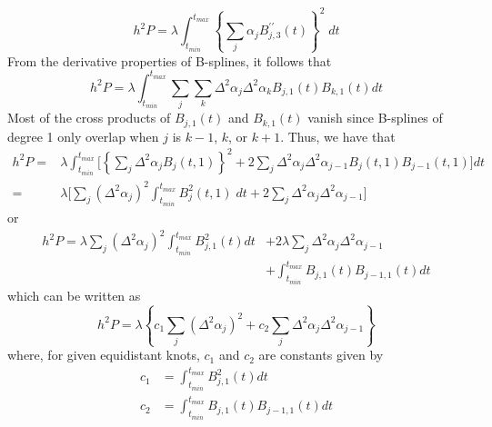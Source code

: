 \documentclass[12pt]{article}
\begin{document}
\begin{equation} \label{eq:osullivan_univariate_bspline_penalty}
h^2 P = \lambda \int_{t_{min}}^{t_{max}} \left\{ \sum_{j}  \alpha_j B_{j,3}^{\prime \prime} \left(t\right) \right\}^2\; dt
\end{equation}
\noindent
From the derivative properties of B-splines, it follows that
\begin{equation} \label{osullivan_univariate_bspline_penalty_via_deriv}
h^2 P = \lambda \int_{t_{min}}^{t_{max}}  \sum_{j} \sum_{k} \Delta^2 \alpha_j \Delta^2 \alpha_k B_{j,1}\left(t\right)B_{k,1}\left(t\right) dt 
\end{equation}
\noindent
Most of the cross products of $B_{j,1}(t)$ and $B_{k,1}(t)$ vanish since B-splines of degree 1 only overlap when $j$ is $k-1$, $k$, or $k+1$. Thus, we have that
\begin{align}
h^2 P = {} & \lambda \int_{t_{min}}^{t_{max}} \bigg[ \left\{ \sum_{j}  \Delta^2 \alpha_j  B_j\left(t,1\right)  \right\}^2  + 2 \sum_{j}\Delta^2 \alpha_j\Delta^2 \alpha_{j-1}B_j\left(t,1\right)B_{j-1}\left(t,1\right) \bigg] dt \nonumber \\ 
= {} & \lambda \bigg[ \sum_j \left( \Delta^2\alpha_j \right)^2 \int_{t_{min}}^{t_{max}} B_j^2\left(t,1\right)\;dt + 2 \sum_j \Delta^2 \alpha_j\Delta^2 \alpha_{j-1} \bigg]
\end{align}
\noindent
or
\begin{align}
h^2 P = \lambda \sum_j \left( \Delta^2\alpha_j \right)^2 \int_{t_{min}}^{t_{max}} B_{j,1}^2\left(t\right) dt {} & +  2\lambda \sum_j \Delta^2 \alpha_j \Delta^2 \alpha_{j-1}  \nonumber \\ 
{} &+\int_{t_{min}}^{t_{max}} B_{j,1}\left(t\right)B_{j-1,1}\left(t\right) dt
\end{align}
\noindent
which can be written as
\begin{equation} \label{eq:osullivan_penalty_decomp}
h^2 P = \lambda\left\{c_1 \sum_j\left( \Delta^2 \alpha_j\right)^2 + c_2 \sum_j\Delta^2 \alpha_j\Delta^2 \alpha_{j-1} \right\}
\end{equation}
\noindent
where, for given equidistant knots, $c_1$ and $c_2$ are constants given by
\begin{equation}
\begin{split}
c_1 & =   \int_{t_{min}}^{t_{max}} B_{j,1}^2\left(t\right) dt\\
c_2 & = \int_{t_{min}}^{t_{max}} B_{j,1}\left(t\right)B_{j-1,1}\left(t\right) dt
\end{split}
\end{equation}
\end{document}
